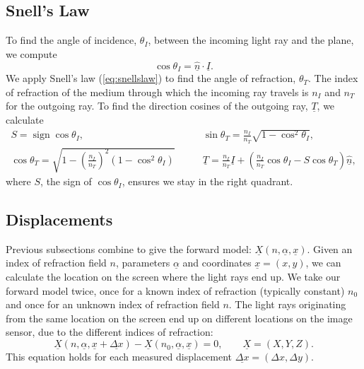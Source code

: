 \documentclass{svjour3}                     %
\DeclareMathOperator{\sign}{sign}
\begin{document}
\subsection{Snell's Law}
To find the angle of incidence, $\theta_I$, between the incoming light ray and the plane, we compute
\begin{equation}
	\cos \theta_I = \underline{\hat{n}} \cdot \underline{I}.
\end{equation}
We apply Snell's law (\ref{eq:snellslaw}) to find the angle of refraction, $\theta_T$. The index of refraction of the medium through which the incoming ray travels is $n_I$ and $n_T$ for the outgoing ray. To find the direction cosines of the outgoing ray, $\underline{T}$, we calculate 
\begin{align}
	S = \sign \cos \theta_I, &\qquad
	\sin \theta_T = \frac{n_I}{n_T} \sqrt{1-\cos^2 \theta_I}, \\
	\cos \theta_T = \sqrt{1-\left(\frac{n_I}{n_T}\right)^2(1-\cos^2 \theta_I)} &\qquad
	\underline{T} = \frac{n_I}{n_T} \underline{I} + \left(\frac{n_I}{n_T} \cos \theta_I - S \cos\theta_T\right)\underline{\hat{n}},	
\end{align}
where $S$, the sign of $\cos\theta_I$, ensures we stay in the right quadrant.

\subsection{Displacements}
\label{subsec:dis}
Previous subsections combine to give the forward model: $\underline{X}(n,\underline{\alpha}, \underline{x})$. Given an index of refraction field $n$, parameters $\underline{\alpha}$ and coordinates $\underline{x} = (x,y)$, we can calculate the location on the screen where the light rays end up. 
We take our forward model twice, once for a known index of refraction (typically constant) $n_0$ and once for an unknown index of refraction field $n$. The light rays originating from the same location on the screen end up on different locations on the image sensor, due to the different indices of refraction:
\begin{equation}
\label{eq:ForwardModel}
	 \underline{X}(n, \underline{\alpha}, \underline{x}+\underline{\Delta x}) - \underline{X}(n_0, \underline{\alpha}, \underline{x}) = 0, \qquad \underline{X} = (X, Y, Z).
\end{equation}
This equation holds for each measured displacement $\underline{\Delta x} = (\Delta x, \Delta y)$. %
\end{document}
